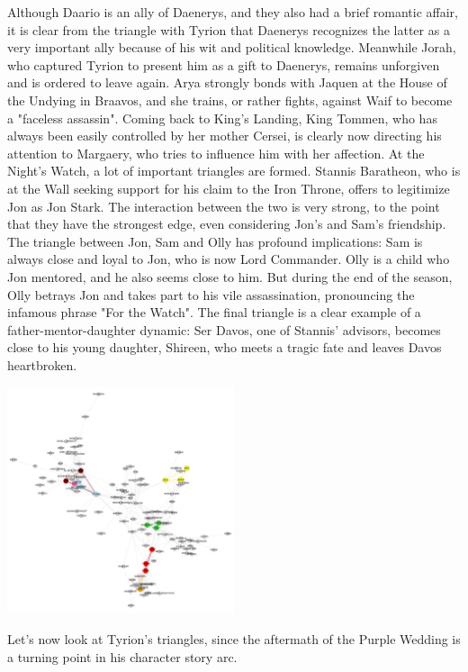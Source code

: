 \documentclass[10pt,twocolumn,letterpaper]{article}
\begin{document}
Although Daario is an ally of Daenerys, and they also had a brief romantic affair, it is clear from the triangle with Tyrion that Daenerys recognizes the latter as a very important ally because of his wit and political knowledge. Meanwhile Jorah, who captured Tyrion to present him as a gift to Daenerys, remains unforgiven and is ordered to leave again. Arya strongly bonds with Jaquen at the House of the Undying in Braavos, and she trains, or rather fights, against Waif to become a "faceless assassin".
Coming back to King's Landing, King Tommen, who has always been easily controlled by her mother Cersei, is clearly now directing his attention to Margaery, who tries to influence him with her affection.
At the Night's Watch, a lot of important triangles are formed. Stannis Baratheon, who is at the Wall seeking support for his claim to the Iron Throne, offers to legitimize Jon as Jon Stark. The interaction between the two is very strong, to the point that they have the strongest edge, even considering Jon's and Sam's friendship. The triangle between Jon, Sam and Olly has profound implications: Sam is always close and loyal to Jon, who is now Lord Commander. Olly is a child who Jon mentored, and he also seems close to him. But during the end of the season, Olly betrays Jon and takes part to his vile assassination, pronouncing the infamous phrase "For the Watch". The final triangle is a clear example of a father-mentor-daughter dynamic: Ser Davos, one of Stannis' advisors, becomes close to his young daughter, Shireen, who meets a tragic fate and leaves Davos heartbroken. 



\begin{center}
    \includegraphics[width=0.5\textwidth]{img/s5/s5_triangles.jpg}
\end{center}

Let's now look at Tyrion's triangles, since the aftermath of the Purple Wedding is a turning point in his character story arc.
\end{document}
